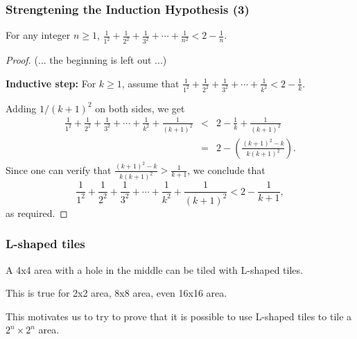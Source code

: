\begin{frame}\frametitle{Strengtening the Induction Hypothesis (3)}
  \begin{theorem}
    For any integer $n\geq 1$, $\frac{1}{1^2} + \frac{1}{2^2} + \frac{1}{3^2} + \cdots +\frac{1}{n^2} < 2 - \frac{1}{n}$.
  \end{theorem}
  \pause
  \begin{proof}
    {\footnotesize
      (... the beginning is left out ...)
      
      {\bf Inductive step:} For $k\geq 1$, assume that $ \frac{1}{1^2} + \frac{1}{2^2} + \frac{1}{3^2} + \cdots +\frac{1}{k^2} < 2 - \frac{1}{k}. $
      
      Adding $1/(k+1)^2$ on both sides, we get
      \begin{eqnarray*}
        \frac{1}{1^2} + \frac{1}{2^2} + \frac{1}{3^2} + \cdots +\frac{1}{k^2}+\frac{1}{(k+1)^2}
        &<& 2 - \frac{1}{k} +\frac{1}{(k+1)^2} \\
        &=& 2 - \left(\frac{(k+1)^2 - k}{k(k+1)^2}\right).
      \end{eqnarray*}
      Since one can verify that $\frac{(k+1)^2 - k}{k(k+1)^2} >
      \frac{1}{k+1}$, we conclude that
      \[
      \frac{1}{1^2} + \frac{1}{2^2} + \frac{1}{3^2} + \cdots +\frac{1}{k^2}+\frac{1}{(k+1)^2} < 2 - \frac{1}{k+1},
      \]
      as required.
    }
  \end{proof}
\end{frame}

\begin{frame}\frametitle{L-shaped tiles}
  A 4x4 area with a hole in the middle can be tiled with L-shaped tiles.

  \vspace{0.2in}
  

  \vspace{0.1in}

  This is true for 2x2 area, 8x8 area, even 16x16 area. \pause

  \vspace{0.1in}

  This motivates us to try to prove that it is possible to use
  L-shaped tiles to tile a $2^n\times 2^n$ area.
\end{frame}

